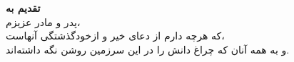 \thispagestyle{empty}
\begin{singlespace}
\vspace*{\fill}
\begin{center}
{\Large\bfseries تقدیم به}\\[6mm]
{\large پدر و مادر عزیزم،\\[2mm]
که هرچه دارم از دعای خیر و ازخودگذشتگی آنهاست،\\[2mm]
و به همه آنان که چراغ دانش را در این سرزمین روشن نگه داشته‌اند.}
\end{center}
\vspace*{\fill}
\end{singlespace}
\clearpage
